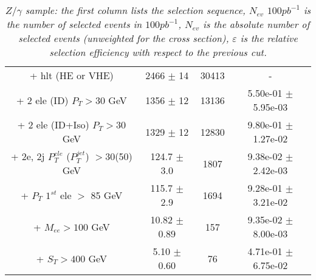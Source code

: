 \documentclass[colclass=cmspaper]{combine}
\begin{document}
\begin{linenumbers}
\begin{table}[htbp]
\begin{center}
\begin{tabular}{|c|c|c|c|}
+ hlt (HE or VHE) &2466 $\pm$ 14& 30413 & - \\
+ 2 ele (ID) $P_{T} >30$ GeV &1356 $\pm$ 12& 13136 & 5.50e-01 $\pm$ 5.95e-03\\
+ 2 ele (ID+Iso) $P_{T} >30$ GeV &1329 $\pm$ 12& 12830 & 9.80e-01 $\pm$ 1.27e-02\\
+ 2e, 2j $P_{T}^{ele}$ ($P_{T}^{jet}$) $>$30(50) GeV &124.7 $\pm$ 3.0 & 1807 & 9.38e-02 $\pm$ 2.42e-03\\
+ $P_{T}$ $1^{st}$ ele $>$ 85 GeV &115.7 $\pm$ 2.9& 1694 & 9.28e-01 $\pm$ 3.21e-02\\
+ $M_{ee} >100$ GeV&10.82 $\pm$ 0.89& 157 & 9.35e-02 $\pm$ 8.00e-03\\
+ $S_{T} >400$ GeV &5.10 $\pm$ 0.60& 76 & 4.71e-01 $\pm$ 6.75e-02\\
\hline
\end{tabular}
\end{center}
\caption{\small \sl $Z/\gamma$ sample: the first column lists the selection sequence, $N_{ev}$ $100pb^{-1}$ is the number of selected events in $100pb^{-1}$, $N_{ev}$ is the absolute number of selected events (unweighted for the cross section), $\varepsilon$ is the relative selection efficiency with respect to the previous cut.}
\label{tab:selection_effic_zjet}
\end{table}




\end{linenumbers}
\end{document}
